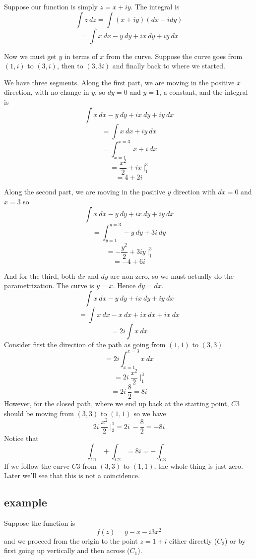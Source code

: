 \documentclass[11pt, oneside]{article}   	%
\begin{document}
Suppose our function is simply $z = x + iy$.  The integral is 
\[ \int z \ dz = \int (x + iy) (dx + i dy) \]
\[ = \int x \ dx - y \ dy + i x \ dy + i y \ dx \]

Now we must get $y$ in terms of $x$ from the curve.  Suppose the curve goes from $(1,i)$ to $(3,i)$, then to $(3,3i)$ and finally back to where we started.  

We have three segments.  Along the first part, we are moving in the positive $x$ direction, with no change in $y$, so $dy=0$ and $y = 1$, a constant, and the integral is
\[ \int x \ dx - y \ dy + i x \ dy + i y \ dx \]
\[ = \int x \ dx + i y \ dx \]
\[ = \int_{x=1}^{x=3} \ x + i  \ dx \]
\[ = \frac{x^2}{2} + ix \ \bigg |_1^3 \]
\[ = 4 + 2i \]

Along the second part, we are moving in the positive $y$ direction with $dx = 0$ and $x = 3$ so
\[ \int x \ dx - y \ dy + i x \ dy + i y \ dx \]
\[ = \int_{y=1}^{y=3} - y \ dy + 3 i \ dy \]
\[ = -\frac{y^2}{2} + 3iy \ \bigg |_1^3 \]
\[ = -4 + 6i \]

And for the third, both $dx$ and $dy$ are non-zero, so we must actually do the parametrization.  The curve is $y=x$.  Hence $dy = dx$.
\[ \int x \ dx - y \ dy + i x \ dy + i y \ dx \]
\[ = \int x \ dx - x \ dx + i x \ dx + i x \ dx \]
\[ = 2i \int x \ dx \]
Consider first the direction of the path as going from $(1,1)$ to $(3,3)$.
\[ = 2i \int_{x=1}^{x=3} x \ dx \]
\[ = 2i \ \frac{x^2}{2} \ \bigg |_1^3 \]
\[ = 2i \ \frac{8}{2} = 8i \]
However, for the closed path, where we end up back at the starting point, $C3$ should be moving from $(3,3)$ to $(1,1)$ so we have 
\[ 2i \ \frac{x^2}{2} \ \bigg |_3^1 = 2i \ - \frac{8}{2} = -8i \]
Notice that 
\[ \int_{C1} + \int_{C2} = 8i  = - \int_{C3}\]
If we follow the curve $C3$ from $(3,3)$ to $(1,1)$, the whole thing is just zero.  Later we'll see that this is not a coincidence.

\subsection*{example}
Suppose the function is
\[ f(z) = y - x - i3x^2 \]
and we proceed from the origin to the point $z = 1 + i$ either directly ($C_2$) or by first going up vertically and then across ($C_1$).
\end{document}
